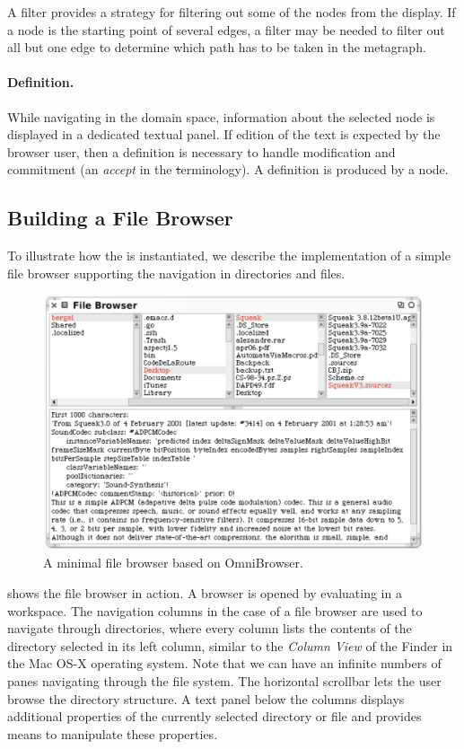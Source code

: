 \documentclass[a4paper,10pt,twoside]{book}
\begin{document}
A filter provides a strategy for filtering out some of the nodes from the display. If a node is the starting point of several edges, a filter may be needed to filter out all but one edge to determine which path has to be taken in the metagraph. 

\paragraph{Definition.} While navigating in the domain space, information about the selected node is displayed in a dedicated textual panel. If edition of the text is expected by the browser user, then a definition is necessary to handle modification and commitment (\ie an \emph{accept} in the \st terminology). A definition is produced by a node. 


\subsection{Building a File Browser}\label{sec:fileBrowserExample}

To illustrate how the \obf is instantiated, we describe the implementation of a simple file browser supporting the navigation in directories and files.

\begin{figure}[!ht]
\begin{center}
\includegraphics[scale=0.54]{filebrowser}
\caption{A minimal file browser based on OmniBrowser.} \label{fig:filebrowser}
\end{center}
\end{figure}

 shows the file browser in action. A browser is opened by evaluating  in a workspace. The navigation columns in the case of a file browser are used to navigate through directories, where every column lists the contents of the directory selected in its left column, similar to the \emph{Column View} of the Finder in the Mac OS-X operating system.
Note that we can have an infinite numbers of panes navigating through the file system. The horizontal scrollbar lets the user browse the directory structure. A text panel below the columns displays additional properties of the currently selected directory or file and provides means to manipulate these properties.
\end{document}
